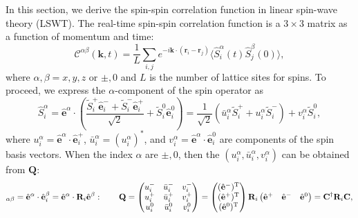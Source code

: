 In this section, we derive the spin-spin correlation function in linear spin-wave theory (LSWT). The real-time spin-spin correlation function is a $3 \times 3$ matrix as a function of momentum and time:
\begin{equation}
    \mathcal{C}^{\alpha\beta}(\mathbf{k}, t) = \frac{1}{L} \sum_{i, j} e^{-i \mathbf{k} \cdot (\mathbf{r}_{i} - \mathbf{r}_{j})} \langle \hat{S}_{i}^{\alpha}(t) \hat{S}_{j}^{\beta}(0) \rangle,
\end{equation}
where $\alpha, \beta = x, y, z$ or $\pm, 0$ and $L$ is the number of lattice sites for spins. To proceed, we express the $\alpha$-component of the spin operator as 
\begin{equation}
    \hat{S}^{\alpha}_{i} 
    = \hat{\mathbf{e}}^{\alpha} \cdot \left( \frac{\widetilde{S}_{i}^{+} \hat{\mathbf{e}}^{-}_{i} + \widetilde{S}_{i}^{-} \hat{\mathbf{e}}^{+}_{i}}{\sqrt{2}} + \widetilde{S}^{0}_{i} \hat{\mathbf{e}}^{0}_{i} \right) 
    = \frac{1}{\sqrt{2}} \left( \bar{u}^{\alpha}_{i} \widetilde{S}_{i}^{+} + u^{\alpha}_{i} \widetilde{S}_{i}^{-} \right) + v^{\alpha}_{i} \widetilde{S}^{0}_{i},
\end{equation}
where $u^{\alpha}_{i} = \hat{\mathbf{e}}^{\alpha} \cdot \hat{\mathbf{e}}^{+}_{i}$, $\bar{u}^{\alpha}_{i} = (u^{\alpha}_{i})^*$, and $v^{\alpha}_{i} = \hat{\mathbf{e}}^{\alpha} \cdot \hat{\mathbf{e}}^{0}_{i}$ are components of the spin basis vectors. 
When the index $\alpha$ are $\pm,0$, then the $(u^{\alpha}_{i}, \bar{u}^{\alpha}_{i}, v^{\alpha}_{i})$ can be obtained from $\mathbf{Q}$:
\begin{equation}
    [\mathbf{Q}]_{\alpha\beta} = 
    \hat{\bf e}^{\alpha} \cdot \hat{\bf e}^{\beta}_{i} = 
    \hat{\bf e}^{\alpha} \cdot \mathbf{R}_{i} \hat{\bf e}^{\beta}: 
    \qquad
    \mathbf{Q}
    =
    \begin{pmatrix}
            u^{-}_{i} &   \bar{u}^{-}_{i}     &   v_{i}^{-}   \\
            u^{+}_{i} &   \bar{u}^{+}_{i}     &   v_{i}^{+}   \\
            u^{0}_{i} &   \bar{u}^{0}_{i}     &   v_{i}^{0}   \\
    \end{pmatrix}
    = 
    \begin{pmatrix}
        (\hat{\bf e}^{-})^{\rm T} \\  
        (\hat{\bf e}^{+})^{\rm T} \\  
        (\hat{\bf e}^{0})^{\rm T} 
    \end{pmatrix}
    \mathbf{R}_{i}
    \begin{pmatrix}
        \hat{\bf e}^{+} & \hat{\bf e}^{-} & \hat{\bf e}^{0}
    \end{pmatrix}
    = \mathbf{C}^{\dagger} \mathbf{R}_{i} \mathbf{C},
\end{equation}
